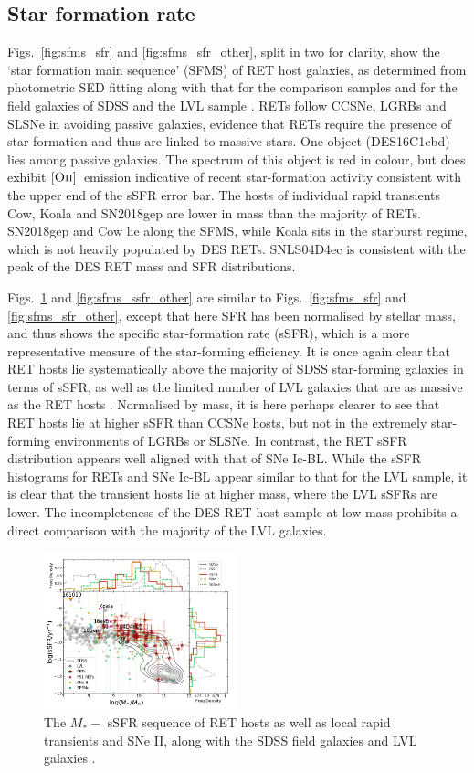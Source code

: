 \documentclass[fleqn,usenatbib,]{mnras}
\newcommand{\replyref}[1]{\color{magenta}#1 \color{black}}
\newcommand{\OII}[0]{$[\textnormal{\textsc{Oii}}]$}
\begin{document}
\subsection{Star formation rate \label{subsec:res_sfr}}
Figs.~\ref{fig:sfms_sfr} and \ref{fig:sfms_sfr_other}, split in two for clarity, show the `star formation main sequence' (SFMS) of RET host galaxies, as determined from photometric SED fitting along with that for the comparison samples and for the field galaxies of SDSS \replyref{and the LVL sample}. RETs follow CCSNe, LGRBs and SLSNe in avoiding passive galaxies, evidence that RETs require the presence of star-formation and thus are linked to massive stars. One object (DES16C1cbd) lies among passive galaxies. The spectrum of this object is red in colour, but does exhibit \OII~emission indicative of recent star-formation activity consistent with the upper end of the sSFR error bar. The hosts of individual rapid transients Cow, Koala and SN2018gep are lower in mass than the majority of RETs. SN2018gep and Cow lie along the SFMS, while Koala sits in the starburst regime, which is not heavily populated by DES RETs. SNLS04D4ec is consistent with the peak of the DES RET mass and SFR distributions. 

Figs.~\ref{fig:sfms_ssfr} and \ref{fig:sfms_ssfr_other} are similar to Figs.~\ref{fig:sfms_sfr} and \ref{fig:sfms_sfr_other}, except that here SFR has been normalised by stellar mass, and thus shows the specific star-formation rate (sSFR), which is a more representative measure of the star-forming efficiency. It is once again clear that RET hosts lie systematically above the majority of SDSS star-forming galaxies in terms of sSFR, \replyref{as well as the limited number of LVL galaxies that are as massive as the RET hosts}. Normalised by mass, it is here perhaps clearer to see that RET hosts lie at higher sSFR than CCSNe hosts, but not in the extremely star-forming environments of LGRBs or SLSNe. \replyref{In contrast, the RET sSFR distribution appears well aligned with that of SNe Ic-BL. While the sSFR histograms for RETs and SNe Ic-BL appear similar to that for the LVL sample, it is clear that the transient hosts lie at higher mass, where the LVL sSFRs are lower. The incompleteness of the DES RET host sample at low mass prohibits a direct comparison with the majority of the LVL galaxies.}



\begin{figure}
\includegraphics[width=0.5\textwidth]{figs/sSFR_Mike_RETs.png}
\caption{The $M_* -$ sSFR sequence of RET hosts as well as local rapid transients and SNe II, along with the SDSS field galaxies \replyref{and LVL galaxies}.
\label{fig:sfms_ssfr}}
\end{figure}
\end{document}

